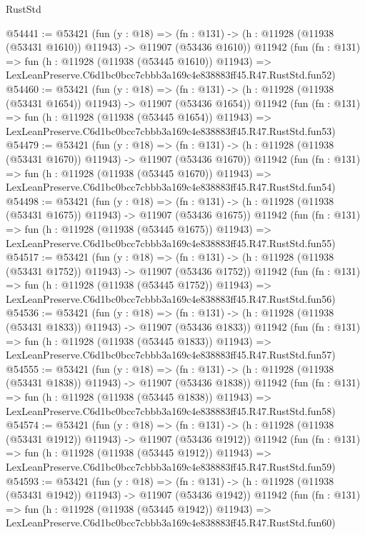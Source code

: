 \begin{lexlean}{RustStd}
\begin{coremodule}
@54441 := @53421
    (fun (y : @18) =>
    (fn : @131) -> (h : @11928 (@11938 (@53431 @1610)) @11943) -> @11907 (@53436 @1610))
    @11942
    (fun (fn : @131) =>
    fun (h : @11928 (@11938 (@53445 @1610)) @11943) =>
    LexLeanPreserve.C6d1bc0bcc7cbbb3a169c4e838883ff45.R47.RustStd.fun52)
@54460 := @53421
    (fun (y : @18) =>
    (fn : @131) -> (h : @11928 (@11938 (@53431 @1654)) @11943) -> @11907 (@53436 @1654))
    @11942
    (fun (fn : @131) =>
    fun (h : @11928 (@11938 (@53445 @1654)) @11943) =>
    LexLeanPreserve.C6d1bc0bcc7cbbb3a169c4e838883ff45.R47.RustStd.fun53)
@54479 := @53421
    (fun (y : @18) =>
    (fn : @131) -> (h : @11928 (@11938 (@53431 @1670)) @11943) -> @11907 (@53436 @1670))
    @11942
    (fun (fn : @131) =>
    fun (h : @11928 (@11938 (@53445 @1670)) @11943) =>
    LexLeanPreserve.C6d1bc0bcc7cbbb3a169c4e838883ff45.R47.RustStd.fun54)
@54498 := @53421
    (fun (y : @18) =>
    (fn : @131) -> (h : @11928 (@11938 (@53431 @1675)) @11943) -> @11907 (@53436 @1675))
    @11942
    (fun (fn : @131) =>
    fun (h : @11928 (@11938 (@53445 @1675)) @11943) =>
    LexLeanPreserve.C6d1bc0bcc7cbbb3a169c4e838883ff45.R47.RustStd.fun55)
@54517 := @53421
    (fun (y : @18) =>
    (fn : @131) -> (h : @11928 (@11938 (@53431 @1752)) @11943) -> @11907 (@53436 @1752))
    @11942
    (fun (fn : @131) =>
    fun (h : @11928 (@11938 (@53445 @1752)) @11943) =>
    LexLeanPreserve.C6d1bc0bcc7cbbb3a169c4e838883ff45.R47.RustStd.fun56)
@54536 := @53421
    (fun (y : @18) =>
    (fn : @131) -> (h : @11928 (@11938 (@53431 @1833)) @11943) -> @11907 (@53436 @1833))
    @11942
    (fun (fn : @131) =>
    fun (h : @11928 (@11938 (@53445 @1833)) @11943) =>
    LexLeanPreserve.C6d1bc0bcc7cbbb3a169c4e838883ff45.R47.RustStd.fun57)
@54555 := @53421
    (fun (y : @18) =>
    (fn : @131) -> (h : @11928 (@11938 (@53431 @1838)) @11943) -> @11907 (@53436 @1838))
    @11942
    (fun (fn : @131) =>
    fun (h : @11928 (@11938 (@53445 @1838)) @11943) =>
    LexLeanPreserve.C6d1bc0bcc7cbbb3a169c4e838883ff45.R47.RustStd.fun58)
@54574 := @53421
    (fun (y : @18) =>
    (fn : @131) -> (h : @11928 (@11938 (@53431 @1912)) @11943) -> @11907 (@53436 @1912))
    @11942
    (fun (fn : @131) =>
    fun (h : @11928 (@11938 (@53445 @1912)) @11943) =>
    LexLeanPreserve.C6d1bc0bcc7cbbb3a169c4e838883ff45.R47.RustStd.fun59)
@54593 := @53421
    (fun (y : @18) =>
    (fn : @131) -> (h : @11928 (@11938 (@53431 @1942)) @11943) -> @11907 (@53436 @1942))
    @11942
    (fun (fn : @131) =>
    fun (h : @11928 (@11938 (@53445 @1942)) @11943) =>
    LexLeanPreserve.C6d1bc0bcc7cbbb3a169c4e838883ff45.R47.RustStd.fun60)

\end{coremodule}
\end{lexlean}
